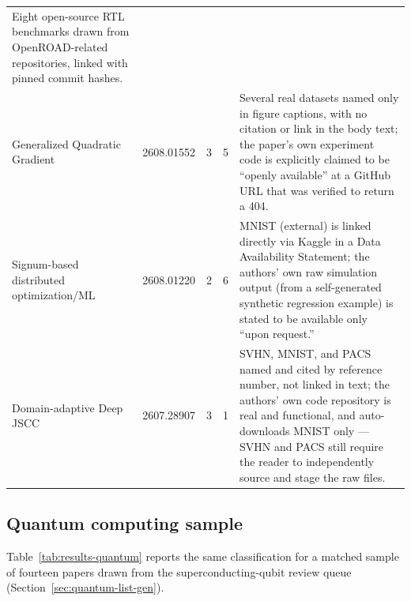 \documentclass[11pt]{article}
\begin{document}
\begin{longtable}{@{}p{4.3cm} p{1.3cm} c c p{5.3cm}@{}}
Eight open-source RTL benchmarks drawn from OpenROAD-related repositories, linked
with pinned commit hashes. \\
\addlinespace
Generalized Quadratic Gradient & 2608.01552 & 3 & 5 &
Several real datasets named only in figure captions, with no citation or link in the
body text; the paper's own experiment code is explicitly claimed to be ``openly
available'' at a GitHub URL that was verified to return a 404. \\
\addlinespace
Signum-based distributed optimization/ML & 2608.01220 & 2 & 6 &
MNIST (external) is linked directly via Kaggle in a Data Availability Statement; the
authors' own raw simulation output (from a self-generated synthetic regression
example) is stated to be available only ``upon request.'' \\
\addlinespace
Domain-adaptive Deep JSCC & 2607.28907 & 3 & 1 &
SVHN, MNIST, and PACS named and cited by reference number, not linked in text; the
authors' own code repository is real and functional, and auto-downloads MNIST only ---
SVHN and PACS still require the reader to independently source and stage the raw
files. \\

\end{longtable}

\subsection{Quantum computing sample}
\label{sec:results-quantum}

Table~\ref{tab:results-quantum} reports the same classification for a matched sample of
fourteen papers drawn from the superconducting-qubit review queue
(Section~\ref{sec:quantum-list-gen}).
\end{document}
